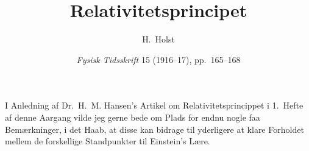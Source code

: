 \documentclass[12pt,a4paper]{article}
\title{\textbf{\guillemotright Relativitetsprincipet\guillemotleft}}
\author{H.\ Holst}
\date{\textit{Fysisk Tidsskrift} 15 (1916--17), pp.~165--168}
\newcommand{\opage}[1]{\marginnote{\footnotesize\textit{[#1]}}}
\begin{document}
\maketitle

\opage{165} %
I Anledning af Dr.~H.~M. Hansen's Artikel om Relativitetsprincippet i
1.~Hefte af denne Aargang vilde jeg gerne bede om Plads for endnu nogle faa
Bemærkninger, i det Haab, at disse kan bidrage til yderligere at klare
Forholdet mellem de forskellige Standpunkter til Einstein's Lære.
\end{document}
